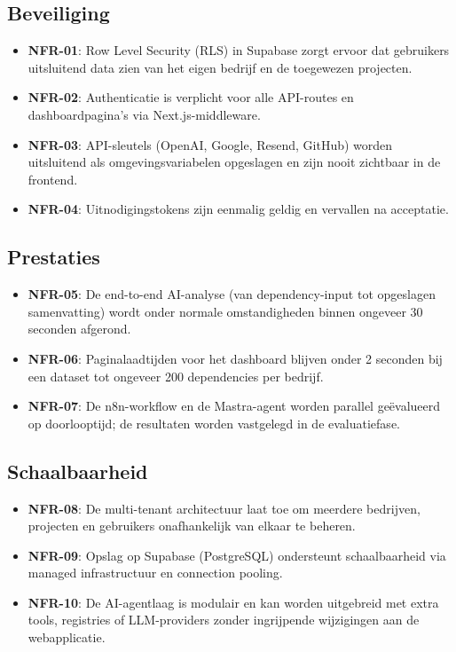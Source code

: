 \subsection{Beveiliging}
\label{sec:nfr-beveiliging}

\begin{itemize}
  \item \textbf{NFR-01}: Row Level Security (RLS) in Supabase zorgt ervoor dat gebruikers uitsluitend data zien van het eigen bedrijf en de toegewezen projecten.
  \item \textbf{NFR-02}: Authenticatie is verplicht voor alle API-routes en dashboardpagina's via Next.js-middleware.
  \item \textbf{NFR-03}: API-sleutels (OpenAI, Google, Resend, GitHub) worden uitsluitend als omgevingsvariabelen opgeslagen en zijn nooit zichtbaar in de frontend.
  \item \textbf{NFR-04}: Uitnodigingstokens zijn eenmalig geldig en vervallen na acceptatie.
\end{itemize}


\subsection{Prestaties}
\label{sec:nfr-prestaties}

\begin{itemize}
  \item \textbf{NFR-05}: De end-to-end AI-analyse (van dependency-input tot opgeslagen samenvatting) wordt onder normale omstandigheden binnen ongeveer 30 seconden afgerond.
  \item \textbf{NFR-06}: Paginalaadtijden voor het dashboard blijven onder 2 seconden bij een dataset tot ongeveer 200 dependencies per bedrijf.
  \item \textbf{NFR-07}: De n8n-workflow en de Mastra-agent worden parallel geëvalueerd op doorlooptijd; de resultaten worden vastgelegd in de evaluatiefase.
\end{itemize}


\subsection{Schaalbaarheid}
\label{sec:nfr-schaalbaarheid}

\begin{itemize}
  \item \textbf{NFR-08}: De multi-tenant architectuur laat toe om meerdere bedrijven, projecten en gebruikers onafhankelijk van elkaar te beheren.
  \item \textbf{NFR-09}: Opslag op Supabase (PostgreSQL) ondersteunt schaalbaarheid via managed infrastructuur en connection pooling.
  \item \textbf{NFR-10}: De AI-agentlaag is modulair en kan worden uitgebreid met extra tools, registries of LLM-providers zonder ingrijpende wijzigingen aan de webapplicatie.
\end{itemize}



